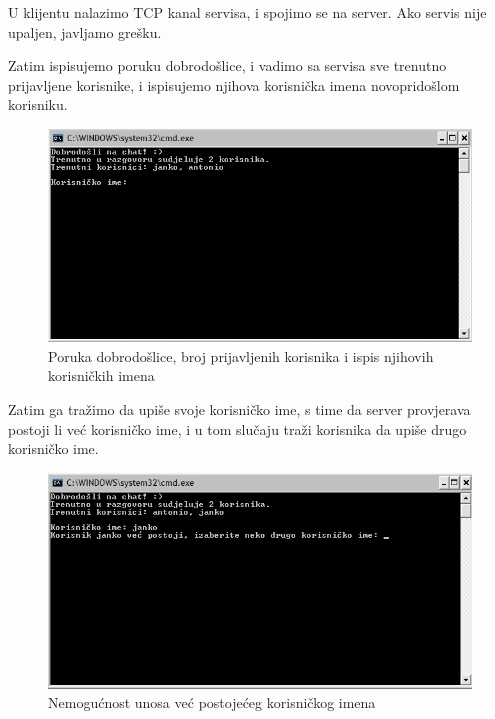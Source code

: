 \documentclass[10pt,a4paper,onecolumn,titlepage]{article}
\begin{document}
U klijentu nalazimo TCP kanal servisa, i spojimo se na server. Ako servis
nije upaljen, javljamo grešku.

Zatim ispisujemo poruku dobrodošlice, i vadimo sa servisa sve trenutno prijavljene
korisnike, i ispisujemo njihova korisnička imena novopridošlom korisniku. 

\begin{figure}[!ht]
\begin{minipage}{\textwidth}
\centering
\includegraphics[width=\textwidth]{images/welcome.jpg}
\caption{Poruka dobrodošlice, broj prijavljenih korisnika i ispis njihovih korisničkih imena}
\end{minipage}
\end{figure}

Zatim ga tražimo da upiše svoje korisničko ime, s time da server provjerava postoji li
već korisničko ime, i u tom slučaju traži korisnika da upiše drugo korisničko ime.

\begin{figure}[!ht]
\begin{minipage}{\textwidth}
\centering
\includegraphics[width=\textwidth]{images/invalid_username.jpg}
\caption{Nemogućnost unosa već postojećeg korisničkog imena}
\end{minipage}
\end{figure}
\end{document}
